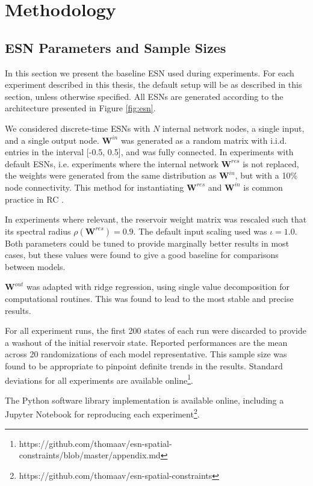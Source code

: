 \chapter{Methodology}
\label{ch:method}

\section{ESN Parameters and Sample Sizes}
\label{sec:esn-param}

In this section we present the baseline ESN used during experiments. For each
experiment described in this thesis, the default setup will be as described in
this section, unless otherwise specified. All ESNs are generated according to
the architecture presented in Figure \ref{fig:esn}.

We considered discrete-time ESNs with $N$ internal network nodes, a single
input, and a single output node. $\mathbf{W}^{in}$ was generated as a random
matrix with i.i.d. entries in the interval [-0.5, 0.5], and was fully
connected. In experiments with default ESNs, i.e. experiments where the internal
network $\mathbf{W}^{res}$ is not replaced, the weights were generated from the
same distribution as $\mathbf{W}^{in}$, but with a 10\% node connectivity. This
method for instantiating $\mathbf{W}^{res}$ and $\mathbf{W}^{in}$ is common
practice in RC \cite{montavon_practical_2012}.

In experiments where relevant, the reservoir weight matrix was rescaled such
that its spectral radius $\rho(\mathbf{W}^{res}) = 0.9$. The default input
scaling used was $\iota = 1.0$. Both parameters could be tuned to provide
marginally better results in most cases, but these values were found to give a
good baseline for comparisons between models.

$\mathbf{W}^{out}$ was adapted with ridge regression, using single value
decomposition for computational routines. This was found to lead to the most
stable and precise results.

For all experiment runs, the first 200 states of each run were discarded to
provide a washout of the initial reservoir state. Reported performances are the
mean across 20 randomizations of each model representative. This sample size was
found to be appropriate to pinpoint definite trends in the results. Standard
deviations for all experiments are available
online\footnote{https://github.com/thomaav/esn-spatial-constraints/blob/master/appendix.md}.

The Python software library implementation is available online, including a
Jupyter Notebook for reproducing each
experiment\footnote{https://github.com/thomaav/esn-spatial-constraints}.

